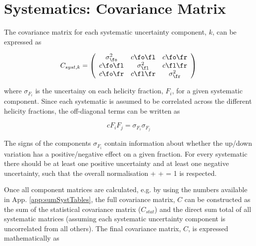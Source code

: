 \clearpage
\section{Systematics: Covariance Matrix}
\label{app:covMatrix}
The covariance matrix for each systematic uncertainty component, $k$, can be expressed as

\begin{equation}
 C_{syst, k} = \left( \begin{array}{ccc}
    \sigma^2_{\fo} &     c\fo\fl    &     c\fo\fr    \\
         c\fo\fl   & \sigma^2_{\fl} &     c\fl\fr    \\
         c\fo\fr   &     c\fl\fr    & \sigma^2_{\fr}
\end{array} \right) 
\end{equation}

where $\sigma_{F_i}$ is the uncertainy on each helicity fraction, $F_i$, for a given systematic component. Since each systematic is assumed to be correlated across the different helicity fractions, the off-diagonal terms can be written as

\begin{equation}
cF_iF_j = \sigma_{F_i}\sigma_{F_j}
\end{equation}

The signs of the components $\sigma_{F_i}$ contain information about whether the up/down variation has a positive/negative effect on a given fraction. For every systematic there should be at least one positive uncertainty and at least one negative uncertainty, such that the overall normalisation \fo + \fl + \fr = 1 is respected.

Once all component matrices are calculated, e.g. by using the numbers available in App. \ref{app:sumSystTables}, the full covariance matrix, $C$ can be constructed as the sum of the statistical covariance matrix ($C_{stat}$) and the direct sum total of all systematic matrices (assuming each systematic uncertainty component is uncorrelated from all others). The final covariance matrix, $C$, is expressed mathematically as

